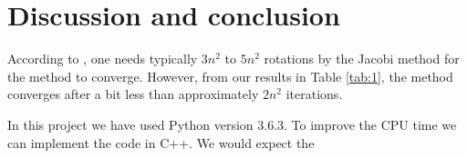 \documentclass{article}
\begin{document}
\section{Discussion and conclusion}\label{sec:conc}

According to \cite{CompPhys}, one needs typically $3n^2$ to $5n^2$ rotations by the Jacobi method for the method to converge. However, from our results in Table \ref{tab:1}, the method converges after a bit less than approximately $2n^2$ iterations. 


In this project we have used Python version 3.6.3. To improve the CPU time we can implement the code in C++. We would expect the 

\newpage

 
\end{document}
